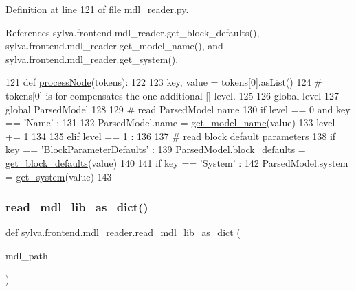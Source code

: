Definition at line 121 of file mdl\+\_\+reader.\+py.



References sylva.\+frontend.\+mdl\+\_\+reader.\+get\+\_\+block\+\_\+defaults(), sylva.\+frontend.\+mdl\+\_\+reader.\+get\+\_\+model\+\_\+name(), and sylva.\+frontend.\+mdl\+\_\+reader.\+get\+\_\+system().


\begin{DoxyCode}
121   \textcolor{keyword}{def }\hyperlink{namespacesylva_1_1frontend_1_1mdl__reader_a7b67abf433ee65dc01be853f378cc616}{processNode}(tokens):
122 
123     key, value = tokens[0].asList()
124     \textcolor{comment}{# tokens[0] is for compensates the one additional [] level.}
125 
126     \textcolor{keyword}{global} level
127     \textcolor{keyword}{global} ParsedModel
128 
129     \textcolor{comment}{# read ParsedModel name}
130     \textcolor{keywordflow}{if} level == 0 \textcolor{keywordflow}{and} key == \textcolor{stringliteral}{'Name'} :
131 
132       ParsedModel.name = \hyperlink{namespacesylva_1_1frontend_1_1mdl__reader_a078c8f3a089b8fd85e32051e6cdb1881}{get\_model\_name}(value)
133       level += 1
134 
135     \textcolor{keywordflow}{elif} level == 1 :
136 
137       \textcolor{comment}{# read block default parameters}
138       \textcolor{keywordflow}{if} key == \textcolor{stringliteral}{'BlockParameterDefaults'} :
139         ParsedModel.block\_defaults = \hyperlink{namespacesylva_1_1frontend_1_1mdl__reader_af44b7256da0388f8bdd76e719520bf8c}{get\_block\_defaults}(value)
140 
141       \textcolor{keywordflow}{if} key == \textcolor{stringliteral}{'System'} :
142         ParsedModel.system = \hyperlink{namespacesylva_1_1frontend_1_1mdl__reader_a51ec6ceefd4c16f0d3d80edbdc40c0e9}{get\_system}(value)
143 
\end{DoxyCode}
\mbox{\label{namespacesylva_1_1frontend_1_1mdl__reader_a98e0329f3a64c7c2d8d9627cf545b130}} 
\subsubsection{\texorpdfstring{read\+\_\+mdl\+\_\+lib\+\_\+as\+\_\+dict()}{read\_mdl\_lib\_as\_dict()}}
{\footnotesize\ttfamily def sylva.\+frontend.\+mdl\+\_\+reader.\+read\+\_\+mdl\+\_\+lib\+\_\+as\+\_\+dict (\begin{DoxyParamCaption}\item[{}]{mdl\+\_\+path }\end{DoxyParamCaption})}



